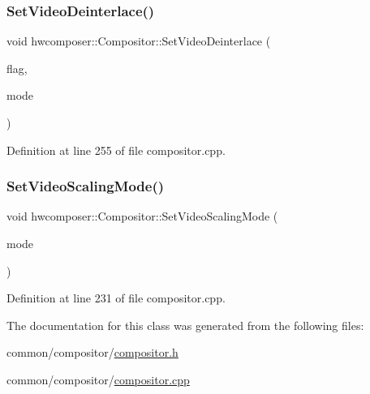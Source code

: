 \subsubsection{\texorpdfstring{Set\+Video\+Deinterlace()}{SetVideoDeinterlace()}}
{\footnotesize\ttfamily void hwcomposer\+::\+Compositor\+::\+Set\+Video\+Deinterlace (\begin{DoxyParamCaption}\item[{H\+W\+C\+Deinterlace\+Flag}]{flag,  }\item[{H\+W\+C\+Deinterlace\+Control}]{mode }\end{DoxyParamCaption})}



Definition at line 255 of file compositor.\+cpp.


\begin{DoxyCode}{0}
\end{DoxyCode}
\mbox{\label{classhwcomposer_1_1Compositor_a82b92f88271cc0c95555b5ca97620e59}} 
\subsubsection{\texorpdfstring{Set\+Video\+Scaling\+Mode()}{SetVideoScalingMode()}}
{\footnotesize\ttfamily void hwcomposer\+::\+Compositor\+::\+Set\+Video\+Scaling\+Mode (\begin{DoxyParamCaption}\item[{uint32\+\_\+t}]{mode }\end{DoxyParamCaption})}



Definition at line 231 of file compositor.\+cpp.


\begin{DoxyCode}{0}
\end{DoxyCode}


The documentation for this class was generated from the following files\+:\begin{DoxyCompactItemize}
\item 
common/compositor/\mbox{\hyperlink{compositor_8h}{compositor.\+h}}\item 
common/compositor/\mbox{\hyperlink{compositor_8cpp}{compositor.\+cpp}}\end{DoxyCompactItemize}

